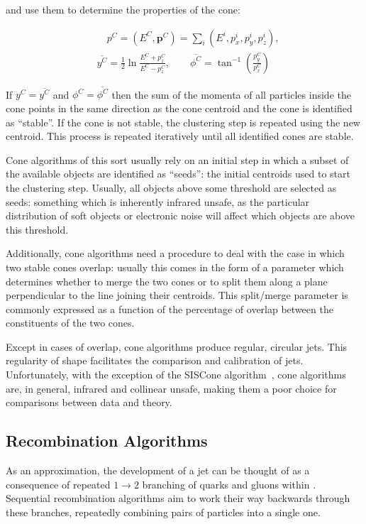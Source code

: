 \noindent and use them to determine the properties of the cone:

\begin{equation}
\begin{split}
  & \quad p^C = \left(E^C,\mathbf{p}^C \right) = \sum_i \left( E^i, p_x^i, p_y^i, p_z^i \right), \\
  & \overline{y^C} = \frac{1}{2} \ln{ \frac{E^C+p_z^C}{E^C-p_z^C} }, \qquad \overline{\phi^C} = \tan^{-1}{ \left( \frac{p_y^C}{p_x^C} \right) }
\end{split}
\end{equation}

\noindent If $y^C = \overline{y^C}$ and $\phi^C = \overline{\phi^C}$ then the sum of the momenta of all particles inside the cone points in the same direction as the cone centroid and the cone is identified as ``stable''.
If the cone is not stable, the clustering step is repeated using the new centroid.
This process is repeated iteratively until all identified cones are stable.

Cone algorithms of this sort usually rely on an initial step in which a subset of the available objects are identified as ``seeds'': the initial centroids used to start the clustering step.
Usually, all objects above some \pT threshold are selected as seeds: something which is inherently infrared unsafe, as the particular distribution of soft objects or electronic noise will affect which objects are above this threshold.

Additionally, cone algorithms need a procedure to deal with the case in which two stable cones overlap: usually this comes in the form of a parameter which determines whether to merge the two cones or to split them along a plane perpendicular to the line joining their centroids.
This split/merge parameter is commonly expressed as a function of the percentage of \pT overlap between the constituents of the two cones.

Except in cases of overlap, cone algorithms produce regular, circular jets.
This regularity of shape facilitates the comparison and calibration of jets.
Unfortunately, with the exception of the SISCone algorithm~\cite{Salam:2007:SISCone}, cone algorithms are, in general, infrared and collinear unsafe, making them a poor choice for comparisons between data and theory.

\subsection{Recombination Algorithms}
\label{bg-theory:recombination_algorithms}
As an approximation, the development of a jet can be thought of as a consequence of repeated $1 \rightarrow 2$ branching of quarks and gluons within \QCD.
Sequential recombination algorithms aim to work their way backwards through these branches, repeatedly combining pairs of particles into a single one.

